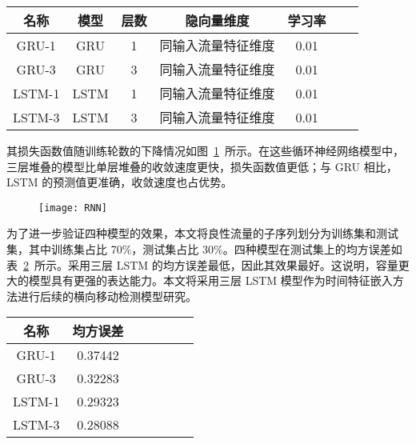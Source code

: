 {\begin{table}[!htbp]
    \label{tab:hyperparameters-rnns}
    \centering
    \footnotesize%
    \setlength{\tabcolsep}{4pt}%
    \renewcommand{\arraystretch}{1.2}%
    \begin{tabular}{ccccccc}
        \hline
        名称 & 模型 & 层数 & 隐向量维度 & 学习率\\
        \hline
        GRU-1 & GRU & 1 & 同输入流量特征维度 & 0.01\\
        GRU-3 & GRU & 3 & 同输入流量特征维度 & 0.01\\
        LSTM-1 & LSTM & 1 & 同输入流量特征维度 & 0.01\\
        LSTM-3 & LSTM & 3 & 同输入流量特征维度 & 0.01\\
        \hline
    \end{tabular}
\end{table}

其损失函数值随训练轮数的下降情况如图~\ref{fig:rnn-plot}~所示。在这些循环神经网络模型中，三层堆叠的模型比单层堆叠的收敛速度更快，损失函数值更低；与 GRU 相比，LSTM 的预测值更准确，收敛速度也占优势。

\begin{figure}[!htbp]
    \centering
    \texttt{[image: RNN]}
    \label{fig:rnn-plot}
\end{figure}

为了进一步验证四种模型的效果，本文将良性流量的子序列划分为训练集和测试集，其中训练集占比 70\%，测试集占比 30\%。四种模型在测试集上的均方误差如表~\ref{tab:result-rnns}~所示。采用三层 LSTM 的均方误差最低，因此其效果最好。这说明，容量更大的模型具有更强的表达能力。本文将采用三层 LSTM 模型作为时间特征嵌入方法进行后续的横向移动检测模型研究。

\begin{table}[!htbp]
    \label{tab:result-rnns}
    \centering
    \footnotesize%
    \setlength{\tabcolsep}{4pt}%
    \renewcommand{\arraystretch}{1.2}%
    \begin{tabular}{ccccccc}
        \hline
        名称 & 均方误差\\
        \hline
        GRU-1 & 0.37442\\
        GRU-3 & 0.32283\\
        LSTM-1 & 0.29323\\
        LSTM-3 & 0.28088\\
        \hline
    \end{tabular}
\end{table}

}
